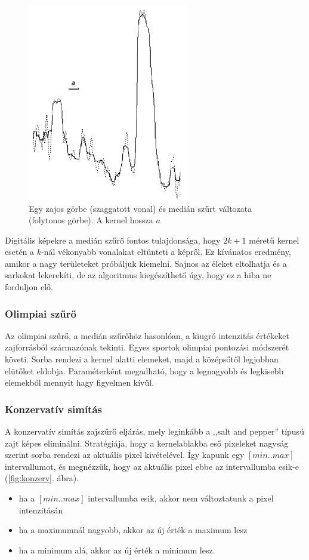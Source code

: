 \documentclass[a4paper,12pt]{article}
\begin{document}
\begin{figure}
	\centering
	\includegraphics[width=7cm]{median.png}
	\caption{Egy zajos görbe (szaggatott vonal) és medián szűrt változata (folytonos görbe).  A kernel hossza $a$}
	\label{fig:median}
\end{figure}

Digitális képekre a medián szűrő fontos tulajdonsága, hogy $2k+1$ méretű kernel
esetén a $k$-nál vékonyabb vonalakat eltünteti a képről. Ez kívánatos eredmény,
amikor a nagy területeket próbáljuk kiemelni. Sajnos az éleket eltolhatja és a
sarkokat lekerekíti, de az algoritmus kiegészíthető úgy, hogy ez a hiba ne
forduljon elő.

\subsubsection{Olimpiai szűrő}

Az olimpiai szűrő, a medián szűrőhöz hasonlóan, a kiugró intenzitás értékeket
zajforrásból származónak tekinti. Egyes
sportok olimpiai pontozási módszerét követi. Sorba rendezi a kernel alatti
elemeket, majd a középsőtől legjobban elütőket eldobja. Paraméterként megadható,
hogy a legnagyobb és legkisebb elemekből mennyit hagy figyelmen kívül. 


\subsubsection{Konzervatív simítás}

A konzervatív simítás zajszűrő eljárás, mely leginkább a ,,salt and pepper''
típusú zajt képes eliminálni. Stratégiája, hogy a kernelablakba eső pixeleket
nagyság szerint sorba rendezi az aktuális pixel kivételével. Így kapunk egy
$[min..max]$ intervallumot, és megnézzük, hogy az aktuális pixel ebbe az
intervallumba esik-e (\ref{fig:konzerv}. ábra). 
\begin{itemize}
	\item ha a $[min..max]$ intervallumba esik, akkor nem változtatunk a pixel
	intenzitásán
	\item ha a maximumnál nagyobb, akkor az új érték a maximum lesz
	\item ha a minimum alá, akkor az új érték a minimum lesz.
\end{itemize}
\end{document}
